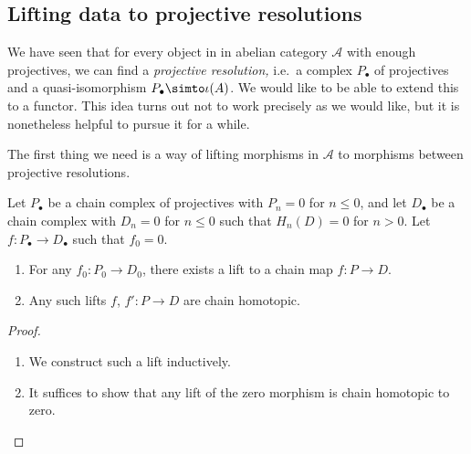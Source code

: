\documentclass[main.tex]{subfiles}
\begin{document}
\subsection{Lifting data to projective resolutions}
\label{ssc:lifting_data_to_projective_resolutions}

We have seen that for every object in in abelian category $\mathcal{A}$ with enough projectives, we can find a \emph{projective resolution,} i.e.\ a complex $P_{\bullet}$ of projectives and a quasi-isomorphism $P_{\bullet} \simto \iota(A)$. We would like to be able to extend this to a functor. This idea turns out not to work precisely as we would like, but it is nonetheless helpful to pursue it for a while.

The first thing we need is a way of lifting morphisms in $\mathcal{A}$ to morphisms between projective resolutions.

\begin{lemma}
  \label{lemma:lift_of_zero_morphism_homotopic_to_zero}
  Let $P_{\bullet}$ be a chain complex of projectives with $P_{n} = 0$ for $n \leq 0$, and let $D_{\bullet}$ be a chain complex with $D_{n} = 0$ for $n \leq 0$ such that $H_{n}(D) = 0$ for $n > 0$. Let $f\colon P_{\bullet} \to D_{\bullet}$ such that $f_{0} = 0$.
  \begin{enumerate}
    \item For any $f_{0}\colon P_{0} \to D_{0}$, there exists a lift to a chain map $f\colon P \to D$.

    \item Any such lifts $f$, $f'\colon P \to D$ are chain homotopic.
  \end{enumerate}
\end{lemma}
\begin{proof}
  \begin{enumerate}
    \item We construct such a lift inductively.

    \item It suffices to show that any lift of the zero morphism is chain homotopic to zero.
  \end{enumerate}
\end{proof}
\end{document}
